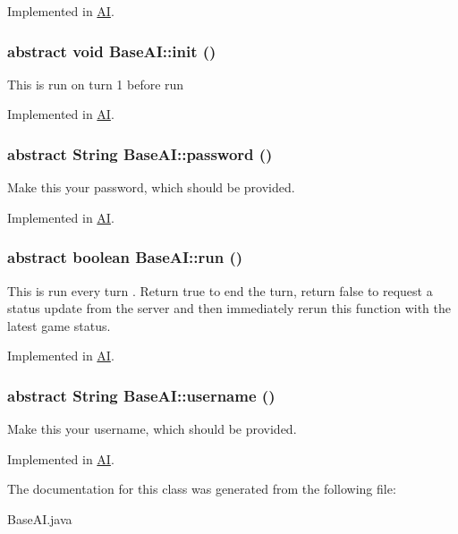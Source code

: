 Implemented in \hyperlink{classAI_a67b00a8dd5c6d73db2e4e2332826462e}{AI}.

\hypertarget{classBaseAI_a71b49f4ca248bfd32a9f9557cb6d494a}{
\subsubsection[{init}]{\setlength{\rightskip}{0pt plus 5cm}abstract void BaseAI::init ()}}
\label{classBaseAI_a71b49f4ca248bfd32a9f9557cb6d494a}
This is run on turn 1 before run 

Implemented in \hyperlink{classAI_a8c8e3a635791abaa61585357e6a25f63}{AI}.

\hypertarget{classBaseAI_a8607533e2b5bd9920ded593ae6509f48}{
\subsubsection[{password}]{\setlength{\rightskip}{0pt plus 5cm}abstract String BaseAI::password ()}}
\label{classBaseAI_a8607533e2b5bd9920ded593ae6509f48}
Make this your password, which should be provided. 

Implemented in \hyperlink{classAI_a405047fd39e03de993183392a06d655b}{AI}.

\hypertarget{classBaseAI_a56c96a58c1f1e93d17f9817711a45594}{
\subsubsection[{run}]{\setlength{\rightskip}{0pt plus 5cm}abstract boolean BaseAI::run ()}}
\label{classBaseAI_a56c96a58c1f1e93d17f9817711a45594}
This is run every turn . Return true to end the turn, return false to request a status update from the server and then immediately rerun this function with the latest game status. 

Implemented in \hyperlink{classAI_af25b3a076daef2aaf9f74ecf458bdfbc}{AI}.

\hypertarget{classBaseAI_aa26770dd7db8dd0c4466dd770d4e05ba}{
\subsubsection[{username}]{\setlength{\rightskip}{0pt plus 5cm}abstract String BaseAI::username ()}}
\label{classBaseAI_aa26770dd7db8dd0c4466dd770d4e05ba}
Make this your username, which should be provided. 

Implemented in \hyperlink{classAI_ad7e6db6b414a192ad2af8656d012cfdc}{AI}.



The documentation for this class was generated from the following file:\begin{DoxyCompactItemize}
\item 
BaseAI.java\end{DoxyCompactItemize}
